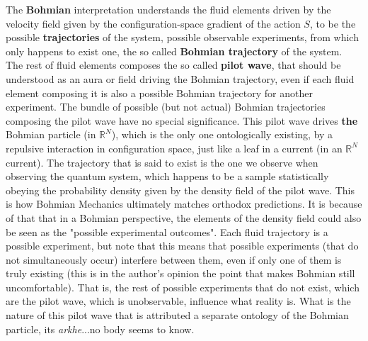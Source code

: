 \documentclass[11pt, a4paper]{article} %
\newcommand{\R}{\mathbb{R}} %
\begin{document}
The {\bf Bohmian} interpretation understands the fluid elements driven by the velocity field given by the configuration-space gradient of the action $S$, to be the possible {\bf trajectories} of the system, possible observable experiments, from which only happens to exist one, the so called {\bf Bohmian trajectory} of the system. The rest of fluid elements composes the so called {\bf pilot wave}, that should be understood as an aura or field driving the Bohmian trajectory, even if each fluid element composing it is also a possible Bohmian trajectory for another experiment. The bundle of possible (but not actual) Bohmian trajectories composing the pilot wave have no special significance. This pilot wave drives {\bf the} Bohmian particle (in $\R^N$), which is the only one ontologically existing, by a repulsive interaction in configuration space, just like a leaf in a current (in an $\R^N$ current). The trajectory that is said to exist is the one we observe when observing the quantum system, which happens to be a sample statistically obeying the probability density given by the density field of the pilot wave. This is how Bohmian Mechanics ultimately matches orthodox predictions. It is because of that that in a Bohmian perspective, the elements of the density field could also be seen as the "possible experimental outcomes". Each fluid trajectory is a possible experiment, but note that this means that possible experiments (that do not simultaneously occur) interfere between them, even if only one of them is truly existing (this is in the author's opinion the point that makes Bohmian still uncomfortable). That is, the rest of possible experiments that do not exist, which are the pilot wave, which is unobservable, influence what reality is. What is the nature of this pilot wave that is attributed a separate ontology of the Bohmian particle, its {\em arkhe}...no body seems to know.
\end{document}
